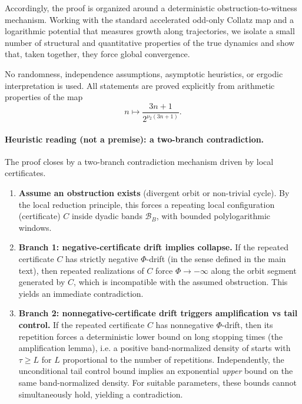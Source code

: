 \documentclass[preprint,12pt]{elsarticle}
\begin{document}
Accordingly, the proof is organized around a deterministic obstruction-to-witness mechanism. Working with the standard accelerated odd-only Collatz map and a logarithmic potential that measures growth along trajectories, we isolate a small number of structural and quantitative properties of the true dynamics and show that, taken together, they force global convergence.

No randomness, independence assumptions, asymptotic heuristics, or ergodic interpretation is used. All statements are proved explicitly from arithmetic properties of the map
\[
n \mapsto \frac{3n+1}{2^{\nu_2(3n+1)}}.
\]

\paragraph{Heuristic reading (not a premise): a two-branch contradiction.}
The proof closes by a two-branch contradiction mechanism driven by local certificates.

\begin{enumerate}
\item \textbf{Assume an obstruction exists} (divergent orbit or non-trivial cycle). By the local reduction principle, this forces a repeating local configuration (certificate) $C$ inside dyadic bands $\mathcal{B}_B$, with bounded polylogarithmic windows.

\item \textbf{Branch 1: negative-certificate drift implies collapse.}
If the repeated certificate $C$ has strictly negative $\Phi$-drift (in the sense defined in the main text), then repeated realizations of $C$ force $\Phi \to -\infty$ along the orbit segment generated by $C$, which is incompatible with the assumed obstruction. This yields an immediate contradiction.

\item \textbf{Branch 2: nonnegative-certificate drift triggers amplification vs tail control.}
If the repeated certificate $C$ has nonnegative $\Phi$-drift, then its repetition forces a deterministic lower bound on long stopping times (the amplification lemma), i.e. a positive band-normalized density of starts with $\tau \ge L$ for $L$ proportional to the number of repetitions. Independently, the unconditional tail control bound implies an exponential \emph{upper} bound on the same band-normalized density. For suitable parameters, these bounds cannot simultaneously hold, yielding a contradiction.
\end{enumerate}
\end{document}
